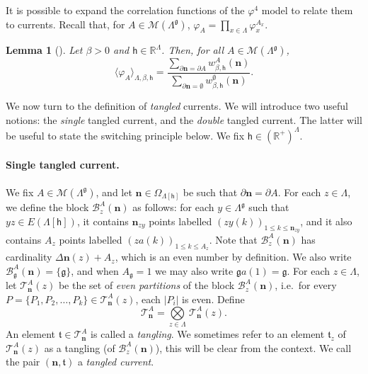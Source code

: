 \documentclass[11pt,a4paper]{article}
\newtheorem{lemma}[theorem]{Lemma}
\theoremstyle{definition}
\numberwithin{equation}{section}
\newcommand\n{\mathbf{n}}
\newcommand\fg{\mathfrak{g}}
\newcommand\sn{\partial\mathbf{n}}
\begin{document}
It is possible to expand the correlation functions of the $\varphi^4$ model to relate them to currents. Recall that, for $A\in \mathcal{M}(\Lambda^\fg)$, $\varphi_A=\prod_{x\in \Lambda}\varphi_x^{A_x}$.
\begin{lemma}[]\label{lem: current expansion} Let $\beta>0$ and $\mathsf{h}\in \mathbb R^\Lambda$. Then, for all $A\in \mathcal{M}(\Lambda^\fg)$,
\begin{equation}
    \langle \varphi_A\rangle_{\Lambda,\beta,\mathsf{h}}=\frac{\sum_{\sn=\partial A}w^A_{\beta,\mathsf{h}}(\n)}{\sum_{\sn=\emptyset}w^\emptyset_{\beta,\mathsf{h}}(\n)}.
\end{equation}
\end{lemma}
We now turn to the definition of \emph{tangled} currents. We will introduce two useful notions: the \emph{single} tangled current, and the \emph{double} tangled current. The latter will be useful to state the switching principle below. We fix $\mathsf{h}\in (\mathbb R^+)^\Lambda$. 

\paragraph{Single tangled current.}
We fix $A \in \mathcal{M}(\Lambda^\fg)$, and let $\n \in 
\Omega_{\Lambda[\mathsf{h}]}$ be such that $\partial \n = \partial 
A$. For each  $z\in \Lambda$, we define the block $
\mathcal{B}^A_z(\n)$ as follows: for each $y\in \Lambda^\fg$ such that $yz\in E(\Lambda[\mathsf{h}])$, it 
contains $\n_{zy}$ points labelled $(zy(k))_{1\leq k \leq 
\n_{zy}}$, and it also contains $A_z$ points labelled $(za(k))_{1\leq k \leq 
A_z}$. Note that $\mathcal{B}^A_z(\n)$ has cardinality $\Delta \n(z)
+A_z$, which is an even number by definition. We also write $
\mathcal{B}^A_\fg(\n)=\lbrace \fg\rbrace$, and when $A_\fg=1$ we may 
also write $\fg a(1)=\fg$. For each $z \in \Lambda$, let $
\mathcal{T}_{\n}^A(z)$ be the set of {\it even partitions} 
of the block $\mathcal{B}^A_z(\n)$, i.e.\ for every $P=\{P_1,P_2,\ldots,P_k\}\in \mathcal{T}_{\n}^A(z)$, each $|P_i|$ is even.
Define
\begin{equation}
\mathcal{T}_{\n}^A
=
\underset{z \in \Lambda}{\bigotimes} \,\mathcal{T}_{\n}^A(z).
\end{equation}
An element $\mathfrak{t} \in \mathcal{T}_{\n}^A$ is called a \textit{tangling}. We sometimes refer to an element $\mathfrak{t}_z$ of $\mathcal{T}_{\n}^A(z)$ as a tangling (of $\mathcal{B}_z^A(\n)$), this will be clear from the context. We call the pair $(\n, \mathfrak{t})$ a \textit{tangled current}. 
\end{document}
